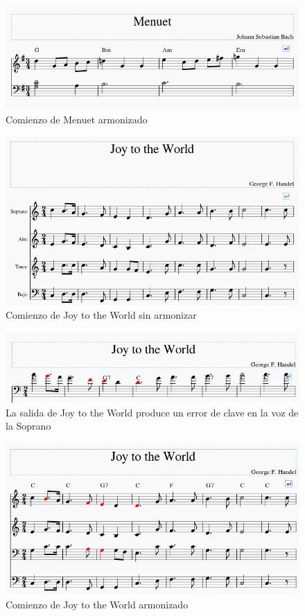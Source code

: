     \begin{figure}
    	\centering
    	\includegraphics[width=0.8\linewidth]{imagenes/evaluation/menuet_harm.png}
    	\caption{Comienzo de Menuet armonizado}
    	\label{fig:menuet_harm}
    \end{figure}
     \begin{figure}
     	\centering
     	\includegraphics[width=0.8\linewidth]{imagenes/evaluation/joy_orig.png}
     	\caption{Comienzo de Joy to the World sin armonizar}
     	\label{fig:joy_orig}
     \end{figure}
  
        \begin{figure}
        	\centering
        	\includegraphics[width=0.8\linewidth]{imagenes/evaluation/joy_harm_err.png}
        	\caption{La salida de Joy to the World produce un error de clave en la voz de la Soprano}
        	\label{fig:joy_harm_err}
        \end{figure}
     
      \begin{figure}
      	\centering
      	\includegraphics[width=0.8\linewidth]{imagenes/evaluation/joy_harm.png}
      	\caption{Comienzo de Joy to the World armonizado}
      	\label{fig:joy_harm}
      \end{figure}
  
